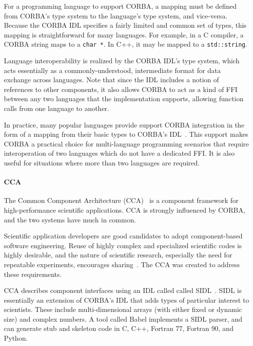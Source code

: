 For a programming language to support CORBA, a mapping must be defined from CORBA's type system to the language's type system, and vice-versa. Because the CORBA IDL specifies a fairly limited and common set of types, this mapping is straightforward for many languages. For example, in a C compiler, a CORBA string maps to a \texttt{char *}. In C++, it may be mapped to a \texttt{std::string}.

Language interoperability is realized by the CORBA IDL's type system, which acts essentially as a commonly-understood, intermediate format for data exchange across languages. Note that since the IDL includes a notion of references to other components, it also allows CORBA to act as a kind of FFI between any two languages that the implementation supports, allowing function calls from one language to another.

In practice, many popular languages provide support CORBA integration in the form of a mapping from their basic types to CORBA's IDL~\cite{vinoski97corba}. This support makes CORBA a practical choice for multi-language programming scenarios that require interoperation of two languages which do not have a dedicated FFI. It is also useful for situations where more than two languages are required.

\paragraph{CCA}

The Common Component Architecture (CCA)~\cite{armstrong99common} is a component framework for high-performance scientific applications. CCA is strongly influenced by CORBA, and the two systems have much in common.

Scientific application developers are good candidates to adopt component-based software engineering. Reuse of highly complex and specialized scientific codes is highly desirable, and the nature of scientific research, especially the need for repeatable experiments, encourages sharing~\cite{kohn01babel}. The CCA was created to address these requirements.


CCA describes component interfaces using an IDL called called SIDL~\cite{smolinski99interop}. SIDL is essentially an extension of CORBA's IDL that adds types of particular interest to scientists. These include multi-dimensional arrays (with either fixed or dynamic size) and complex numbers. A tool called Babel implements a SIDL parser, and can generate stub and skeleton code in C, C++, Fortran 77, Fortran 90, and Python.

